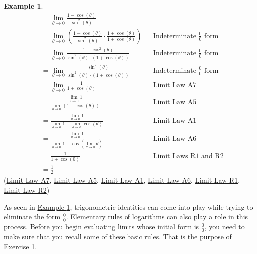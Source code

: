 \documentclass[12pt,]{book}
\theoremstyle{plain}
\theoremstyle{definition}
\newtheorem{example}[theorem]{Example}
\numberwithin{equation}{section}
\newcommand{\fe}[2]{#1\mathopen{}\left(#2\right)\mathclose{}}
\begin{document}
\begin{example}\label{example-second-indeterminate}
\begin{align*}
&\phantom{{}={}}\lim_{\theta\to0}\frac{1-\fe{\cos}{\theta}}{\fe{\sin^2}{\theta}}\\
&=\lim_{\theta\to0}\left(\frac{1-\fe{\cos}{\theta}}{\fe{\sin^2}{\theta}}\cdot\frac{1+\fe{\cos}{\theta}}{1+\fe{\cos}{\theta}}\right)&&\text{Indeterminate $\frac{0}{0}$ form}\\
&=\lim_{\theta\to0}\frac{1-\fe{\cos^2}{\theta}}{\fe{\sin^2}{\theta}\cdot\left(1+\fe{\cos}{\theta}\right)}&&\text{Indeterminate $\frac{0}{0}$ form}\\
&=\lim_{\theta\to0}\frac{\fe{\sin^2}{\theta}}{\fe{\sin^2}{\theta}\cdot\left(1+\fe{\cos}{\theta}\right)}&&\text{Indeterminate $\frac{0}{0}$ form}\\
&=\lim_{\theta\to0}\frac{1}{1+\fe{\cos}{\theta}}&&\text{Limit Law A7}\\
&=\frac{\lim_{\theta\to0}1}{\lim_{\theta\to0}\left(1+\fe{\cos}{\theta}\right)}&&\text{Limit Law A5}\\
&=\frac{\lim_{\theta\to0}1}{\lim_{\theta\to0}1+\lim_{\theta\to0}\fe{\cos}{\theta}}&&\text{Limit Law A1}\\
&=\frac{\lim_{\theta\to0}1}{\lim_{\theta\to0}1+\fe{\cos}{\lim_{\theta\to0}\theta}}&&\text{Limit Law A6}\\
&=\frac{1}{1+\fe{\cos}{0}}&&\text{Limit Laws R1 and R2}\\
&=\frac{1}{2}
\end{align*}(\hyperref[lla7]{Limit Law A7}, \hyperref[lla5]{Limit Law A5}, \hyperref[lla1]{Limit Law A1}, \hyperref[lla6]{Limit Law A6}, \hyperref[llr1]{Limit Law R1}, \hyperref[llr2]{Limit Law R2})%
\end{example}
\par
As seen in \hyperref[example-second-indeterminate]{Example \ref{example-second-indeterminate}}, trigonometric identities can come into play while trying to eliminate the form \(\frac{0}{0}\). Elementary rules of logarithms can also play a role in this process. Before you begin evaluating limits whose initial form is \(\frac{0}{0}\), you need to make sure that you recall some of these basic rules. That is the purpose of \hyperlink{exercise-identities-review}{Exercise 1}.%
\typeout{************************************************}
\typeout{************************************************}
\end{document}
